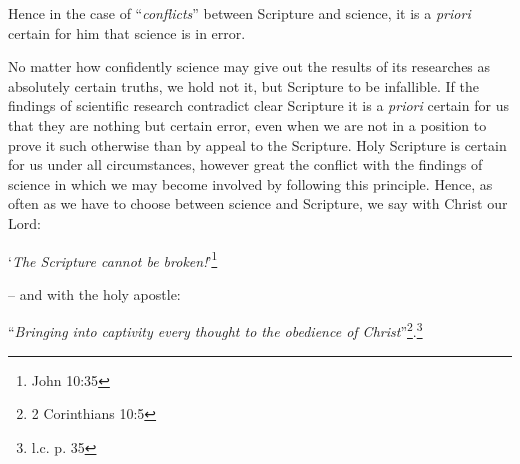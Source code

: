                Hence in the case of “\textit{conflicts}” between Scripture and science, it is a \textit{priori} certain for him that science is in error. \begin{fancyquotes} No matter how confidently science may give out the results of its researches as absolutely certain truths, we hold not it, but Scripture to be infallible.  If the findings of scientific research contradict clear Scripture it is a \textit{priori} certain for us that they are nothing but certain error, even when we are not in a position to prove it such otherwise than by appeal to the Scripture.  Holy Scripture is certain for us under all circumstances, however great the conflict with the findings of science in which we may become involved by following this principle.  Hence, as often as we have to choose between science and Scripture, we say with Christ our Lord: \begin{displayquote} ‘\textit{The Scripture cannot be broken!}'\footnote{John 10:35}\end{displayquote} -- and with the holy apostle: \begin{displayquote}“\textit{Bringing into captivity every thought to the obedience of Christ}”\footnote{2 Corinthians 10:5}.\footnote{l.c. p. 35}\end{displayquote}\end{fancyquotes}

